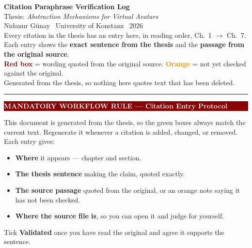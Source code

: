 \documentclass[11pt, a4paper]{article}
\begin{document}
\begin{Form}

\begin{center}
  {\Large\bfseries\textcolor{konstanzblue}{Citation Paraphrase Verification Log}}\\[6pt]
  {\normalsize Thesis: \textit{Abstraction Mechanisms for Virtual Avatars}}\\
  {\normalsize Nidanur Günay \textbullet\ University of Konstanz \textbullet\ 2026}\\[4pt]
  {\small Every citation in the thesis has an entry here, in reading order, Ch.~1 $\to$ Ch.~7.}\\
  {\small Each entry shows the \textbf{exact sentence from the thesis} and the \textbf{passage from the original source}.}\\[4pt]
  {\small \textcolor{darkred}{\textbf{Red box}} = wording quoted from the original source. \quad
          \textcolor{darkorange}{\textbf{Orange}} = not yet checked against the original.}\\[2pt]
  {\small Generated from the thesis, so nothing here quotes text that has been deleted.}\\[2pt]
\end{center}

\vspace{8pt}
\noindent\textcolor{midgray}{\rule{\linewidth}{0.8pt}}

\vspace{6pt}
\noindent\colorbox{darkred}{\parbox{\dimexpr\linewidth-2\fboxsep}{%
  \vspace{4pt}
  \textcolor{white}{\textbf{MANDATORY WORKFLOW RULE — Citation Entry Protocol}}
  \vspace{4pt}
}}
\vspace{4pt}

\noindent This document is generated from the thesis, so the green boxes always match the current text. Regenerate it whenever a citation is added, changed, or removed. Each entry gives:
\begin{itemize}
  \item \textbf{Where} it appears --- chapter and section.
  \item \textbf{The thesis sentence} making the claim, quoted exactly.
  \item \textbf{The source passage} quoted from the original, or an orange note saying it has not been checked.
  \item \textbf{Where the source file is}, so you can open it and judge for yourself.
\end{itemize}
\noindent Tick \textbf{Validated} once you have read the original and agree it supports the sentence.


\end{Form}
\end{document}
